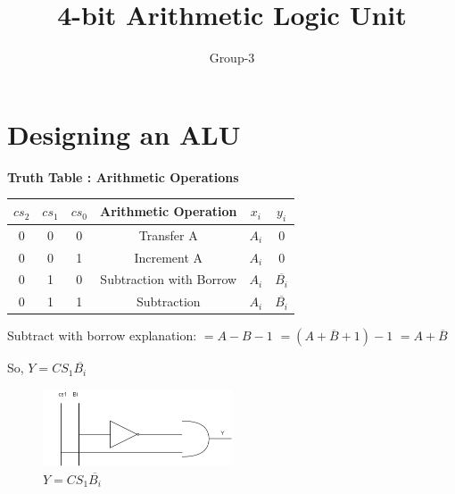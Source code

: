 \documentclass[]{article}
\title{4-bit Arithmetic Logic Unit}
\author{Group-3}
\begin{document}
	
	\maketitle
	
	\newpage
	\section{Designing an ALU}
	
	\textbf{Truth Table : Arithmetic Operations}
	\begin{center}
		\begin{tabular}{ |c|c|c|c|c|c| } 
			\hline
			$cs_2$ & $cs_1$ & $cs_0$ & Arithmetic Operation & $x_i$ & $y_i$  \\
			\hline
			
			\hline
			0 & 0 & 0 & Transfer A & $A_i$ & 0 \\
			\hline

			\hline
			0 & 0 & 1 & Increment A & $A_i$ & 0 \\
			\hline
			
			\hline
			0 & 1 & 0 & Subtraction with Borrow & $A_i$ & $\overline{B_i}$ \\
			\hline
			
			\hline
			0 & 1 & 1 & Subtraction & $A_i$ & $\overline{B_i}$ \\
			\hline
		\end{tabular}
	\end{center}
	
	
	
	Subtract with borrow explanation:\newline
	$=A-B-1$ \newline
	$=(A+\overline{B}+1)-1$ \newline
	$=A+\overline{B}$ \newline
	
	So, $Y=CS_1\overline{B_i}$
	\begin{figure}[h]
		\centering
		\includegraphics[width = 0.5\textwidth]{image/ckt1.png}
		\caption{
		$Y=CS_1\overline{B_i}$
		}
		\label{fig:ckt1}
		
	\end{figure}
	
\end{document}
